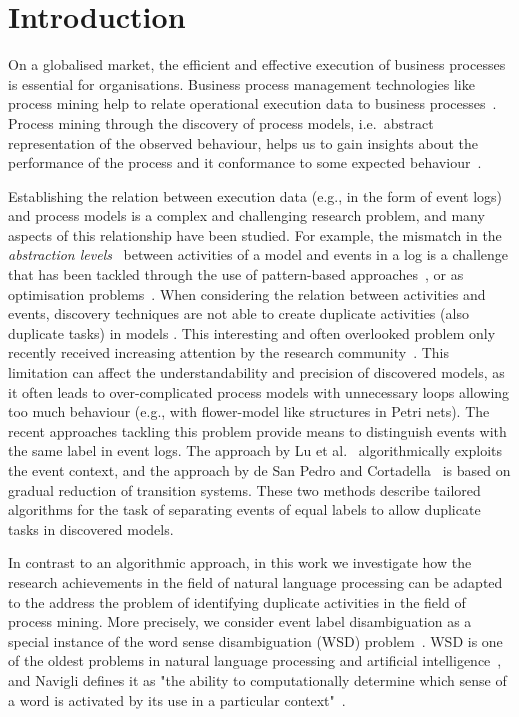 \section{Introduction}
\label{sec:intro}
On a globalised market, the efficient and effective execution of business processes is essential for organisations. Business process management technologies like process mining help to relate operational execution data to business processes~\cite{DBLP:books/daglib/0031128}. Process mining through the discovery of process models, i.e.\ abstract representation of the observed behaviour, helps us to gain insights about the performance of the process and it conformance to some expected behaviour~\cite{DBLP:books/sp/Aalst16}.

Establishing the relation between execution data (e.g., in the form of event logs) and process models is a complex and challenging research problem, and many aspects of this relationship have been studied. For example, the mismatch in the \emph{abstraction levels}~\cite{DBLP:journals/is/0001MW14} between activities of a model and events in a log is a challenge that has been tackled through the use of pattern-based approaches~\cite{DBLP:conf/bpm/MannhardtLRAT16}, or as optimisation problems~\cite{DBLP:conf/caise/SenderovichRGMM16}.%
When considering the relation between activities and events, discovery techniques are not able to create duplicate activities (also duplicate tasks) in models \cite{DBLP:journals/topnoc/Carmona12,tie2009clustering,XiaoHui2009alphaStartStar}. This interesting and often overlooked problem only recently received increasing attention by the research community~\cite{DBLP:conf/bpm/LuFBA16,DBLP:conf/bpm/PedroC16}. This limitation can affect the understandability and precision of discovered models, as it often leads to over-complicated process models with unnecessary loops allowing too much behaviour (e.g., with flower-model like structures in Petri nets).
The recent approaches tackling this problem provide means to distinguish events with the same label in event logs. The approach by Lu et al.~\cite{DBLP:conf/bpm/LuFBA16} algorithmically exploits the event context, and the approach by de San Pedro and Cortadella~\cite{DBLP:conf/bpm/PedroC16} is based on gradual reduction of transition systems. These two methods describe tailored algorithms for the task of separating events of equal labels to allow duplicate tasks in discovered models.

In contrast to an algorithmic approach, in this work we investigate how the research achievements in the field of natural language processing can be adapted to the address the problem of identifying duplicate activities in the field of process mining.
More precisely, we consider event label disambiguation as a special instance of the word sense disambiguation (WSD) problem~\cite{DBLP:journals/csur/Navigli09}. WSD is one of the oldest problems in natural language processing and artificial intelligence~\cite{article_from_50s}, and Navigli defines it as "the ability to computationally determine which sense of a word is activated by its use in a particular context"~\cite{DBLP:journals/csur/Navigli09}. 

